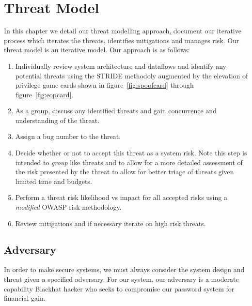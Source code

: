 \chapter{Threat Model}
\label{ch:threatmodel}
In this chapter we detail our threat modelling approach, document our iterative
process which iterates the threats, identifies mitigations and manages risk.
Our threat model is an iterative model.  Our approach is as follows:
\begin{enumerate}
    \item{Individually review system architecture and dataflows and identify any
potential threats using the STRIDE methodoly augmented by the elevation of
privilege game cards shown in figure~\ref{fig:spoofcard} through
figure~\ref{fig:eopcard}.}
    \item{As a group, discuss any identified threats and gain concurrence and
understanding of the threat.}
    \item{Assign a bug number to the threat.}
    \item{Decide whether or not to accept this threat as a system risk.  Note
this step is intended to \emph{group} like threats and to allow for a more
detailed assessment of the risk presented by the threat to allow for better
triage of threats given limited time and budgets.}
    \item{Perform a threat risk likelihood vs impact for all accepted risks
using a \emph{modified} OWASP risk methodology.}
    \item{Review mitigations and if necessary iterate on high risk threats.}
\end{enumerate}


\section{Adversary}
\label{sec:adversary}
In order to make secure systems, we must always consider the system design and
threat given a specified adversary.  For our system, our adversary is a moderate
capability Blackhat hacker who seeks to compromise our password system for
financial gain.

